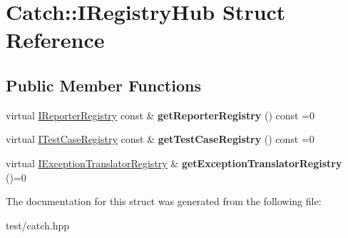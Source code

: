\hypertarget{structCatch_1_1IRegistryHub}{}\section{Catch\+:\+:I\+Registry\+Hub Struct Reference}
\label{structCatch_1_1IRegistryHub}
\subsection*{Public Member Functions}
\begin{DoxyCompactItemize}
\item 
virtual \hyperlink{structCatch_1_1IReporterRegistry}{I\+Reporter\+Registry} const \& {\bfseries get\+Reporter\+Registry} () const =0\hypertarget{structCatch_1_1IRegistryHub_a55534563f7ecf7e20ec1e37285ebe54d}{}\label{structCatch_1_1IRegistryHub_a55534563f7ecf7e20ec1e37285ebe54d}

\item 
virtual \hyperlink{structCatch_1_1ITestCaseRegistry}{I\+Test\+Case\+Registry} const \& {\bfseries get\+Test\+Case\+Registry} () const =0\hypertarget{structCatch_1_1IRegistryHub_af4f6255f0c0f8f1f179fa9d7d4843076}{}\label{structCatch_1_1IRegistryHub_af4f6255f0c0f8f1f179fa9d7d4843076}

\item 
virtual \hyperlink{structCatch_1_1IExceptionTranslatorRegistry}{I\+Exception\+Translator\+Registry} \& {\bfseries get\+Exception\+Translator\+Registry} ()=0\hypertarget{structCatch_1_1IRegistryHub_a3606988da110c016c5af3ae63454eb78}{}\label{structCatch_1_1IRegistryHub_a3606988da110c016c5af3ae63454eb78}

\end{DoxyCompactItemize}


The documentation for this struct was generated from the following file\+:\begin{DoxyCompactItemize}
\item 
test/catch.\+hpp\end{DoxyCompactItemize}
